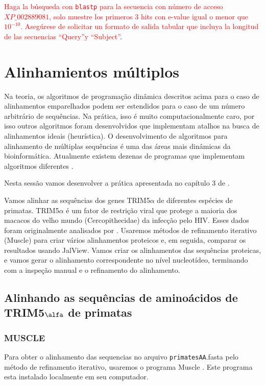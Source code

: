\documentclass[letter,11pt]{book}
\begin{document}
\textcolor{red}{Haga la búsqueda con \Verb+blastp+ para la secuencia con número de acceso $XP\_002889081$, solo muestre los primeros 3 hits con e-value igual o menor que $10^{-10}$. Asegúrese de solicitar un formato de salida tabular que incluya la longitud de las secuencias ``Query''y ``Subject''}.

\chapter{Alinhamientos múltiplos}

Na teoria, os algoritmos de programação dinâmica descritos acima para o caso de alinhamentos emparelhados podem ser estendidos para o caso de um número arbitrário de sequências. Na prática, isso é muito computacionalmente caro, por isso outros algoritmos foram desenvolvidos que implementam atalhos na busca de alinhamentos ideais (heurística). O desenvolvimento de algoritmos para alinhamento de múltiplas sequências é uma das áreas mais dinâmicas da bioinformática. Atualmente existem dezenas de programas que implementam algoritmos diferentes \citetext{olha\citealp{Notredame2007} e \citealp{Lemey2009} para uma revisão recente do tópico}.

Nesta sessão vamos desenvolver a prática apresentada no capítulo 3 de \citealp{Lemey2009}.

Vamos alinhar as sequências dos genes TRIM5$\alpha$ de diferentes espécies de primatas. TRIM5$\alpha$ é um fator de restrição viral que protege a maioria dos macacos do velho mundo (Cercopithecidae) da infecção pelo HIV. Esses dados foram originalmente analisados por \citealp{Sawyer2005}. Usaremos métodos de refinamento iterativo ({\sc Muscle}) para criar vários alinhamentos proteicos e, em seguida, comparar os resultados usando {\sc JalView}. Vamos criar os alinhamentos das sequências proteicas, e vamos gerar o alinhamento correspondente no nível nucleotídeo, terminando com a inspeção manual e o refinamento do alinhamento.

\section{Alinhando as sequências de aminoácidos de TRIM5$\alfa$ de primatas}

\subsection{{\sc MUSCLE}}

Para obter o alinhamento das sequencias no arquivo \Verb+primatesAA+.fasta pelo método de refinamento iterativo, usaremos o programa {\sc Muscle} \citep{Edgar2004}. Este programa esta instalado localmente em seu computador.
\end{document}

